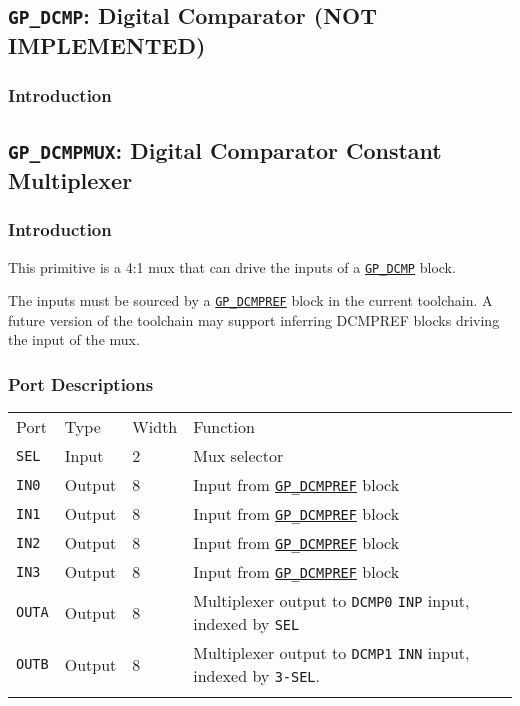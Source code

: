 \documentclass[11pt]{article}
\newcommand{\tokenstyle}[1]{\texttt{#1}}
\newcommand{\whenstyle}[1]{{\fontseries{sb}\selectfont#1}}
\newcommand{\tokenref}[2]{\hyperref[#2]{\tokenstyle{#1}}}
\newcommand{\thinhline}{\Xhline{1\arrayrulewidth}}
\newcommand{\thickhline}{\Xhline{2.5\arrayrulewidth}}
\begin{document}

\pagebreak
\subsection{\tokenstyle{GP\_DCMP}: Digital Comparator (NOT IMPLEMENTED)}
\label{gp-dcmp}

\subsubsection{Introduction}


\pagebreak
\subsection{\tokenstyle{GP\_DCMPMUX}: Digital Comparator Constant Multiplexer}
\label{gp-dcmpmux}

\subsubsection{Introduction}

This primitive is a 4:1 mux that can drive the inputs of a \tokenref{GP\_DCMP}{gp-dcmp} block. 

The inputs must be sourced by a \tokenref{GP\_DCMPREF}{gp-dcmpref} block in the current toolchain. A future version of the 
toolchain may support inferring DCMPREF blocks driving the input of the mux.

\subsubsection{Port Descriptions}

\begin{tabularx}{\textwidth}{lllX}
\thinhline
\whenstyle{Port} & \whenstyle{Type} & \whenstyle{Width} & \whenstyle{Function} \\
\thickhline
\tokenstyle{SEL} & Input & 2 & Mux selector \\
\thinhline
\tokenstyle{IN0} & Output & 8 & Input from \tokenref{GP\_DCMPREF}{gp-dcmpref} block\\
\thinhline
\tokenstyle{IN1} & Output & 8 & Input from \tokenref{GP\_DCMPREF}{gp-dcmpref} block\\
\thinhline
\tokenstyle{IN2} & Output & 8 & Input from \tokenref{GP\_DCMPREF}{gp-dcmpref} block\\
\thinhline
\tokenstyle{IN3} & Output & 8 & Input from \tokenref{GP\_DCMPREF}{gp-dcmpref} block\\
\thinhline
\tokenstyle{OUTA} & Output & 8 & Multiplexer output to \tokenstyle{DCMP0} \tokenstyle{INP} input, indexed by \tokenstyle{SEL} \\
\thinhline
\tokenstyle{OUTB} & Output & 8 & Multiplexer output to \tokenstyle{DCMP1} \tokenstyle{INN} input, indexed by \tokenstyle{3-SEL}. \\
\thinhline
\end{tabularx}
\end{document}

